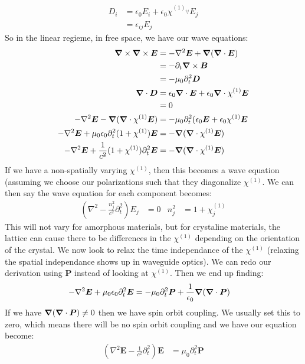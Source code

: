 \begin{align*}
	D_i &= \epsilon_0 E_i + \epsilon_0 \chi^{(1)_{ij}}E_j \\
		&= \epsilon_{ij} E_j
\end{align*}
So in the linear regieme, in free space, we have our wave equations:
\begin{align*}
	\bm{\nabla}\times\bm{\nabla}\times\bm{E} &= -\nabla^2\bm{E} + \bm{\nabla}(\bm{\nabla}\cdot\bm{E}) \\
	&= -\partial_t \bm{\nabla}\times\bm{B} \\
	&= -\mu_0\partial_t^2\bm{D} \\
	\bm{\nabla}\cdot\bm{D} &= \epsilon_0 \bm{\nabla}\cdot\bm{E} + \epsilon_0\bm{\nabla}\cdot\chi^{(1)}\bm{E} \\
	&= 0 \\
	-\nabla^2\bm{E} - \bm{\nabla}(\bm{\nabla}\cdot \chi^{(1)}\bm{E}) &= -\mu_0\partial_t^2(\epsilon_0\bm{E} + \epsilon_0\chi^{(1)}\bm{E} \\
	-\nabla^2\bm{E} + \mu_0\epsilon_0\partial_t^2(1 + \chi^{(1)}) \bm{E} &= -\bm{\nabla}(\bm{\nabla}\cdot\chi^{(1)}\bm{E}) \\
	-\nabla^2\bm{E} + \frac{1}{c^2}(1 + \chi^{(1)}) \partial_t^2\bm{E} &= -\bm{\nabla}(\bm{\nabla}\cdot\chi^{(1)}\bm{E})
\end{align*}
If we have a non-spatially varying $\chi^{(1)}$, then this becomes a wave equation (assuming we choose our polarizations such that they diagonalize $\chi^{(1)}$. We can then say the wave equation for each component becomes:
\begin{align*}
	\left(\nabla^2 - \frac{n_j^2}{c^2}\partial_t^2\right)E_j &= 0 & n_j^2 &= 1 + \chi^{(1)}_j
\end{align*}
This will not vary for amorphous materials, but for crystaline materials, the lattice can cause there to be differences in the $\chi^{(1)}$ depending on the orientation of the crystal.
We now look to relax the time independance of the $\chi^{(1)}$ (relaxing the spatial independance shows up in waveguide optics).
We can redo our derivation using $\bm{P}$ instead of looking at $\chi^{(1)}$. Then we end up finding:
\begin{align*}
	-\nabla^2\bm{E} + \mu_0\epsilon_0 \partial_t^2\bm{E} &= -\mu_0\partial_t^2\bm{P} + \frac{1}{\epsilon_0} \bm{\nabla}(\bm{\nabla}\cdot\bm{P})
\end{align*}
If we have $\bm{\nabla}(\bm{\nabla}\cdot\bm{P})\not=0$ then we have spin orbit coupling. We usually set this to zero, which means there will be no spin orbit coupling and we have our equation become:
\begin{align*}
	\left(\nabla^2\bm{E} - \frac{1}{c^2}\partial_t^2\right)\bm{E} &= \mu_0\partial_t^2\bm{P}
\end{align*}
